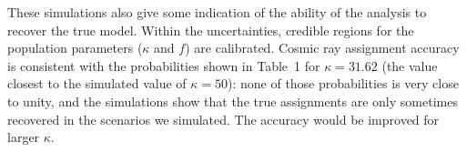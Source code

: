 These simulations also give some indication of the ability of the analysis
to recover the true model.  Within the uncertainties,
credible regions for the population parameters ($\kappa$ and $f$) are
calibrated.  Cosmic ray assignment accuracy is consistent with the probabilities
shown in Table~1 for $\kappa=31.62$ (the value closest to the simulated
value of $\kappa=50$):  none of those probabilities is very close to unity, and
the simulations show that the true assignments are only sometimes recovered
in the scenarios we simulated.  The accuracy would be improved for
larger $\kappa$.
